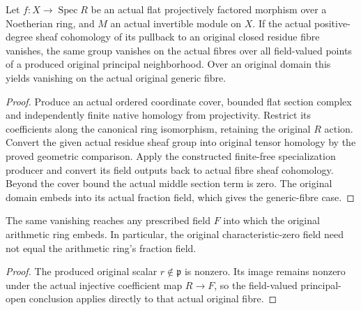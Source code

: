 \begin{theorem}
\label{thm:kn-derived-geometric-cohomology-specialization}
\leanok
Let $f:X\to\operatorname{Spec}R$ be an actual flat projectively
factored morphism over a Noetherian ring, and $M$ an actual invertible
module on $X$.  If the actual positive-degree sheaf cohomology of
its pullback to an original closed residue fibre vanishes, the same
group vanishes on the actual fibres over all field-valued points
of a produced original principal neighborhood.  Over an original
domain this yields vanishing on the actual original generic fibre.
\end{theorem}
\begin{proof}
Produce an actual ordered coordinate cover, bounded flat section
complex and independently finite native homology from projectivity.
Restrict its coefficients along the canonical ring isomorphism,
retaining the original $R$ action.  Convert the given actual
residue sheaf group into original tensor homology by the proved
geometric comparison.  Apply the constructed finite-free
specialization producer and convert its field outputs back to
actual fibre sheaf cohomology.  Beyond the cover bound the actual
middle section term is zero.  The original domain embeds into its
actual fraction field, which gives the generic-fibre case.
\end{proof}

\begin{corollary}
\label{cor:kn-derived-geometric-cohomology-injective-field}
\leanok
The same vanishing reaches any prescribed field $F$ into which the
original arithmetic ring embeds.  In particular, the original
characteristic-zero field need not equal the arithmetic ring's
fraction field.
\end{corollary}
\begin{proof}
The produced original scalar $r\notin\mathfrak p$ is nonzero.
Its image remains nonzero under the actual injective coefficient
map $R\to F$, so the field-valued principal-open conclusion applies
directly to that actual original fibre.
\end{proof}


